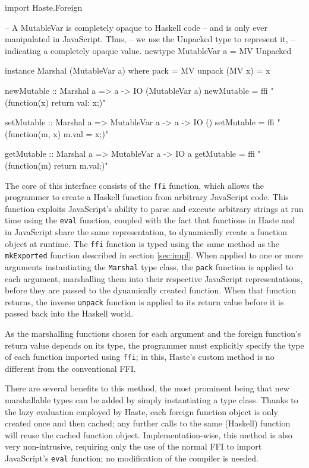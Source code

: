 \documentclass[preprint]{sigplanconf}
\begin{document}
\begin{listingfloat}
\begin{code}
import Haste.Foreign

-- A MutableVar is completely opaque to Haskell code
-- and is only ever manipulated in JavaScript. Thus,
-- we use the Unpacked type to represent it,
-- indicating a completely opaque value.
newtype MutableVar a = MV Unpacked

instance Marshal (MutableVar a) where
  pack          = MV
  unpack (MV x) = x

newMutable :: Marshal a => a -> IO (MutableVar a)
newMutable = ffi "(function(x) {return {val: x};})"

setMutable :: Marshal a => MutableVar a -> a -> IO ()
setMutable = ffi "(function(m, x) {m.val = x;})"

getMutable :: Marshal a => MutableVar a -> IO a
getMutable = ffi "(function(m) {return m.val;})"
\end{code}
\caption{Mutable variables with \lstinline!Haste.Foreign!}
\label{lst:ffi}
\end{listingfloat}

The core of this interface consists of the \lstinline!ffi! function, which
allows the programmer to create a Haskell function from arbitrary JavaScript
code. This function exploits JavaScript's ability to parse and execute
arbitrary strings at run time using the \lstinline!eval! function, coupled with
the fact that functions in Haste and in JavaScript share the same
representation, to dynamically create a function object at runtime.
The \lstinline!ffi! function is typed using the same method as the
\lstinline!mkExported! function described in section \ref{sec:impl}.
When applied to one or more arguments instantiating the \lstinline!Marshal!
type class, the \lstinline!pack! function is applied to each argument,
marshalling them into their respective JavaScript representations, before they
are passed to the dynamically created function. When that function returns,
the inverse \lstinline!unpack! function is applied to its return value before
it is passed back into the Haskell world.

As the marshalling functions chosen for each argument and the foreign
function's return value depends on its type, the programmer must explicitly
specify the type of each function imported using \lstinline!ffi!; in this,
Haste's custom method is no different from the conventional FFI.

There are several benefits to this method, the most prominent being that new
marshallable types can be added by simply instantiating a type class. Thanks
to the lazy evaluation employed by Haste, each foreign function object is only
created once and then cached; any further calls to the same (Haskell) function
will reuse the cached function object. Implementation-wise, this method is also
very non-intrusive, requiring only the use of the normal FFI to import
JavaScript's \lstinline!eval! function; no modification of the compiler is
needed.
\end{document}
